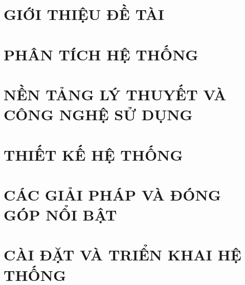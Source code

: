 \documentclass[a4paper,13pt,3p,twoside]{report}
\theoremstyle{definition}
\begin{document}
\glsaddallunused
\renewcommand*{\glossaryname}{DANH MỤC THUẬT NGỮ}
\renewcommand*{\acronymname}{DANH MỤC TỪ VIẾT TẮT}
\renewcommand*{\entryname}{Thuật ngữ}
\renewcommand*{\descriptionname}{Ý nghĩa}
\printnoidxglossary[title={DANH MỤC THUẬT NGỮ},toctitle={DANH MỤC THUẬT NGỮ}]
\printnoidxglossary[type=\acronymtype,title={DANH MỤC TỪ VIẾT TẮT},toctitle={DANH MỤC TỪ VIẾT TẮT}]



\clearpage
{}
\setcounter{page}{1}
\hypersetup{pageanchor=true}

\pagestyle{fancy}
\fancyhf{}
\renewcommand{\chaptermark}[1]{\markboth{#1}{}}
\fancyhead[RE, LO]{\leftmark}
\fancyfoot[RE, LO]{\thepage}

\chapter{GIỚI THIỆU ĐỀ TÀI}
\label{chapter:Introduction}


\newpage
\chapter{PHÂN TÍCH HỆ THỐNG}
\label{chapter:SystemAnalysis}


\newpage
\chapter{NỀN TẢNG LÝ THUYẾT VÀ CÔNG NGHỆ SỬ DỤNG}
\label{chapter:Theory}


\newpage
\chapter{THIẾT KẾ HỆ THỐNG}
\label{chapter:SystemDesign}


\newpage
\chapter{CÁC GIẢI PHÁP VÀ ĐÓNG GÓP NỔI BẬT}
\label{chapter:Solutions}


\newpage
\chapter{CÀI ĐẶT VÀ TRIỂN KHAI HỆ THỐNG}
\label{chapter:Implementation}

\end{document}
